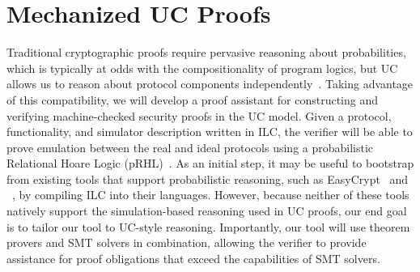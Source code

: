 \section{Mechanized UC Proofs}
\label{sec:verification}

Traditional cryptographic proofs require pervasive reasoning about
probabilities, which is typically at odds with the compositionality of program
logics, but UC allows us to reason about protocol components
independently~\cite{chong2016report}. Taking advantage of this compatibility, we
will develop a proof assistant for constructing and verifying machine-checked
security proofs in the UC model. Given a protocol, functionality, and simulator
description written in ILC, the verifier will be able to prove emulation
between the real and ideal protocols using a probabilistic Relational Hoare
Logic (pRHL)~\cite{barthe2011computer}. As an initial step, it may be useful to
bootstrap from existing tools that support probabilistic reasoning, such as
EasyCrypt~\cite{barthe2011computer} and \fstar~\cite{swamy2016dependent}, by
compiling ILC into their languages. However, because neither of these tools
natively support the simulation-based reasoning used in UC proofs, our end goal
is to tailor our tool to UC-style reasoning. Importantly, our tool will use
theorem provers and SMT solvers in combination, allowing the verifier to provide
assistance for proof obligations that exceed the capabilities of SMT solvers.
